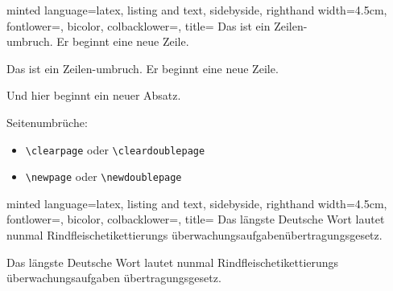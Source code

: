\documentclass[
    ngerman,
    accentcolor=3b,
    dark_mode,
    fontsize= 12pt,
    a4paper,
    aspectratio=169,
    colorback=true,
    fancy_row_colors,
    leqno,
    fleqn,
    boxarc=3pt,
    fleqn,
]{algoslides}
\begin{document}
    \begin{frame}[c, fragile]
        \slidehead{}
        \begin{codeBlock}[]{
            minted language=latex,
            listing and text,
            sidebyside,
            righthand width=4.5cm,
            fontlower=\setlength{\parskip}{\medskipamount}\setlength{\parindent}{2em},
            bicolor,
            colbacklower=,
            title=
            }
            \setlength{\parindent}{0em}
            Das ist ein Zeilen-\\umbruch. Er beginnt eine neue Zeile.

            Das ist ein Zeilen-\linebreak umbruch. Er beginnt eine neue Zeile.

            Und hier beginnt ein neuer Absatz.
        \end{codeBlock}
    \end{frame}

    \begin{frame}[c, fragile]
        \slidehead{}
        Seitenumbrüche:
        \begin{itemize}
            \item \verb+\clearpage+ oder \verb+\cleardoublepage+
            \item \verb+\newpage+ oder \verb+\newdoublepage+
        \end{itemize}
    \end{frame}

    \begin{frame}[c, fragile]
        \slidehead{}
        \begin{codeBlock}[]{
            minted language=latex,
            listing and text,
            sidebyside,
            righthand width=4.5cm,
            fontlower=\setlength{\parskip}{\medskipamount}\setlength{\parindent}{0em},
            bicolor,
            colbacklower=,
            title=
            }
            Das längste Deutsche Wort lautet nunmal Rindfleischetikettierungs%
            überwachungsaufgabenübertragungsgesetz.

            Das längste Deutsche Wort lautet nunmal Rindfleisch\-etikettierungs%
            überwachungs\-auf\-gaben%
            \-übertragungs\-gesetz.
        \end{codeBlock}
    \end{frame}
\end{document}
